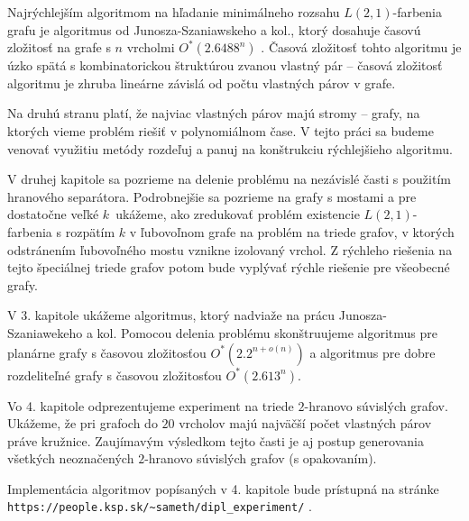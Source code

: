 Najrýchlejším algoritmom na hľadanie minimálneho rozsahu $L(2,1)$-farbenia grafu
je algoritmus od Junosza-Szaniawskeho a kol., ktorý dosahuje časovú zložitosť
na grafe s $n$ vrcholmi $O^*(2.6488^n)$ \cite{junosza_fast}. Časová zložitosť tohto algoritmu je úzko spätá
s kombinatorickou štruktúrou zvanou vlastný pár -- časová zložitosť algoritmu je
zhruba lineárne závislá od počtu vlastných párov v grafe.

Na druhú stranu platí, že najviac vlastných párov majú stromy -- grafy, na ktorých
vieme problém riešiť v polynomiálnom čase. V tejto práci sa budeme venovať využitiu
metódy rozdeľuj a panuj na konštrukciu rýchlejšieho algoritmu.

V druhej kapitole sa pozrieme na delenie problému na nezávislé časti s použitím
hranového separátora. Podrobnejšie sa pozrieme na grafy s mostami a pre dostatočne
veľké $k$ ukážeme, ako zredukovať problém existencie $L(2,1)$-farbenia s rozpätím $k$
v ľubovoľnom grafe na problém na triede grafov, v ktorých odstránením ľubovoľného mostu vznikne izolovaný
vrchol. Z rýchleho riešenia na tejto špeciálnej triede grafov potom bude vyplývať
rýchle riešenie pre všeobecné grafy.

V 3. kapitole ukážeme algoritmus, ktorý nadviaže na prácu Junosza-Szaniawekeho a kol.
Pomocou delenia problému skonštruujeme algoritmus pre planárne grafy s časovou
zložitosťou $O^*(2.2^{n+ o(n)})$ a algoritmus pre dobre rozdeliteľné grafy s časovou
zložitosťou $O^*(2.613^n)$.

Vo 4. kapitole odprezentujeme experiment na triede $2$-hranovo súvislých grafov.
Ukážeme, že pri grafoch do $20$ vrcholov majú najväčší počet vlastných párov
práve kružnice. Zaujímavým výsledkom tejto časti je aj postup generovania všetkých
neoznačených $2$-hranovo súvislých grafov (s opakovaním).

Implementácia algoritmov popísaných v 4. kapitole bude prístupná na stránke
\verb+https://people.ksp.sk/~sameth/dipl_experiment/+ .
